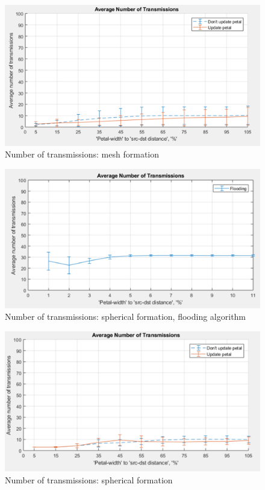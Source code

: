 \begin{figure}[hbtp]
\centering
\includegraphics[width=\textwidth,height=\textheight,keepaspectratio]{ncsuthesis-0.6/Chapter-5/figs/pe_trans_mesh.png}
\caption{Number of transmissions: mesh formation}
\label{fig:pe_trans_mesh}
\end{figure}

\begin{figure}[hbtp]
\centering
\includegraphics[width=\textwidth,height=\textheight,keepaspectratio]{ncsuthesis-0.6/Chapter-5/figs/fl_trans_spherical.png}
\caption{Number of transmissions: spherical formation, flooding algorithm}
\label{fig:fl_trans_spherical}
\end{figure}

\begin{figure}[hbtp]
\centering
\includegraphics[width=\textwidth,height=\textheight,keepaspectratio]{ncsuthesis-0.6/Chapter-5/figs/pe_trans_spherical.png}
\caption{Number of transmissions: spherical formation}
\label{fig:pe_trans_spherical}
\end{figure}

